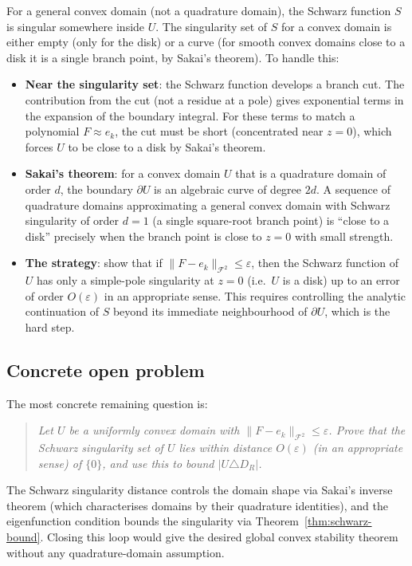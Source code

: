 \documentclass[a4paper,11pt,reqno]{amsart}
\begin{document}
For a general convex domain (not a quadrature domain), the Schwarz function
$S$ is singular somewhere inside $U$. The singularity set of $S$ for a convex
domain is either empty (only for the disk) or a curve (for smooth convex domains
close to a disk it is a single branch point, by Sakai's theorem). To handle
this:
\begin{itemize}
\item \textbf{Near the singularity set}: the Schwarz function develops a
  branch cut. The contribution from the cut (not a residue at a pole) gives
  exponential terms in the expansion of the boundary integral. For these terms
  to match a polynomial $F\approx e_k$, the cut must be short (concentrated
  near $z=0$), which forces $U$ to be close to a disk by Sakai's theorem.
\item \textbf{Sakai's theorem}: for a convex domain $U$ that is a quadrature
  domain of order $d$, the boundary $\partial U$ is an algebraic curve of
  degree $2d$. A sequence of quadrature domains approximating a general
  convex domain with Schwarz singularity of order $d=1$ (a single square-root
  branch point) is ``close to a disk'' precisely when the branch point is
  close to $z=0$ with small strength.
\item \textbf{The strategy}: show that if $\|F-e_k\|_{\mathcal{F}^2}\le\varepsilon$,
  then the Schwarz function of $U$ has only a simple-pole singularity at
  $z=0$ (i.e.\ $U$ is a disk) up to an error of order $O(\varepsilon)$ in
  an appropriate sense. This requires controlling the analytic continuation
  of $S$ beyond its immediate neighbourhood of $\partial U$, which is the
  hard step.
\end{itemize}

\subsection{Concrete open problem}

The most concrete remaining question is:
\begin{quote}
\emph{Let $U$ be a uniformly convex domain with $\|F-e_k\|_{\mathcal{F}^2}\le\varepsilon$.
Prove that the Schwarz singularity set of $U$ lies within distance $O(\varepsilon)$
(in an appropriate sense) of $\{0\}$, and use this to bound $|U\triangle D_R|$.}
\end{quote}
The Schwarz singularity distance controls the domain shape via Sakai's inverse
theorem (which characterises domains by their quadrature identities), and the
eigenfunction condition bounds the singularity via Theorem~\ref{thm:schwarz-bound}.
Closing this loop would give the desired global convex stability theorem without
any quadrature-domain assumption.
\end{document}
